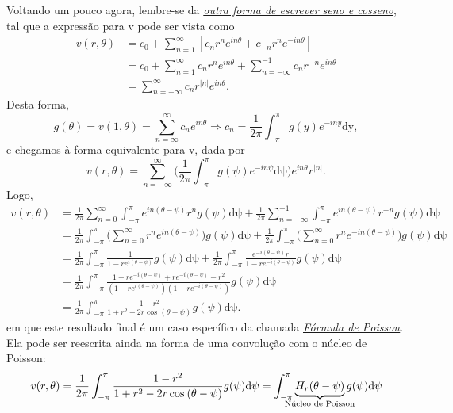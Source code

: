 \documentclass[../pde_notes.tex]{subfiles}
\begin{document}
Voltando um pouco agora, lembre-se da \hyperlink{euler_formula}{\textit{outra forma de escrever seno e cosseno}}, tal que a expressão para v pode ser vista como
\begin{align*}
	v(r, \theta ) & = c_{0} + \sum\limits_{n=1}^{\infty}[c_{n}r^{n}e^{in\theta }+c_{-n}r^{n}e^{-in\theta }]                            \\
	              & = c_{0} + \sum\limits_{n=1}^{\infty}c_{n}r^{n}e^{in\theta } + \sum\limits_{n=-\infty}^{-1}c_{n}r^{-n}e^{in\theta } \\
	              & = \sum\limits_{n=-\infty}^{\infty}c_{n}r^{|n|}e^{in\theta }.
\end{align*}
Desta forma,
\[
	g(\theta ) = v(1, \theta ) = \sum\limits_{n=\infty}^{\infty}c_{n}e^{in\theta } \Rightarrow c_{n} = \frac{1}{2\pi }\int_{-\pi }^{\pi }g(y)e^{-iny} \mathrm{dy},
\]
e chegamos à forma equivalente para v, dada por
\[
	v(r, \theta ) = \sum\limits_{n=-\infty}^{\infty}\biggl(\frac{1}{2\pi }\int_{-\pi }^{\pi }g(\psi)e^{-in\psi} \mathrm{d\psi}\biggr)e^{in\theta }r^{|n|}.
\]
Logo,
\begin{align*}
	v(r, \theta  ) & = \frac{1}{2\pi }\sum\limits_{n=0}^{\infty}\int_{-\pi }^{\pi }e^{in(\theta  -\psi )}r^{n}g(\psi ) \mathrm{d\psi } + \frac{1}{2\pi }\sum\limits_{n=-\infty}^{-1}\int_{-\pi }^{\pi }e^{in(\theta -\psi )}r^{-n}g(\psi ) \mathrm{d\psi }                           \\
	               & = \frac{1}{2\pi }\int_{-\pi }^{\pi }\biggl(\sum\limits_{n=0}^{\infty}r^{n}e^{in(\theta  -\psi )}\biggr)g(\psi ) \mathrm{d\psi } + \frac{1}{2\pi }\int_{-\pi }^{\pi }\biggl(\sum\limits_{n=0}^{\infty}r^{n}e^{-in(\theta -\psi )}\biggr)g(\psi ) \mathrm{d\psi } \\
	               & = \frac{1}{2\pi }\int_{-\pi }^{\pi }\frac{1}{1-re^{i(\theta -\psi )}}g(\psi ) \mathrm{d\psi} + \frac{1}{2\pi }\int_{-\pi }^{\pi }\frac{e^{-i(\theta  -\psi )}r}{1-re^{-i(\theta  -\psi )}} g(\psi )\mathrm{d\psi }                                              \\
	               & = \frac{1}{2\pi }\int_{-\pi }^{\pi }\frac{1-re^{-i(\theta -\psi )}+re^{-i(\theta -\psi )}-r^{2}}{(1-re^{i(\theta -\psi )})(1-re^{-i(\theta -\psi )})}g(\psi ) \mathrm{d\psi }                                                                                   \\
	               & = \frac{1}{2\pi }\int_{-\pi }^{\pi }\frac{1-r^{2}}{1+r^{2}-2r\cos^{}{(\theta -\psi )}}g(\psi ) \mathrm{d\psi }.
\end{align*}
em que este resultado final é um caso específico da chamada \hyperlink{poisson_formula}{\textit{Fórmula de Poisson}}. Ela pode ser reescrita ainda na forma de uma convolução com o núcleo de Poisson:
\[
	v(r, \theta )= \frac{1}{2\pi }\int_{-\pi }^{\pi }\frac{1-r^{2}}{1+r^{2}-2r\cos^{}{(\theta -\psi )}}g(\psi ) \mathrm{d\psi } = \int_{-\pi }^{\pi }\underbrace{H_r(\theta -\psi )}_{\mathclap{\text{Núcleo de Poisson}}}g(\psi ) \mathrm{d\psi }
\]
\end{document}
